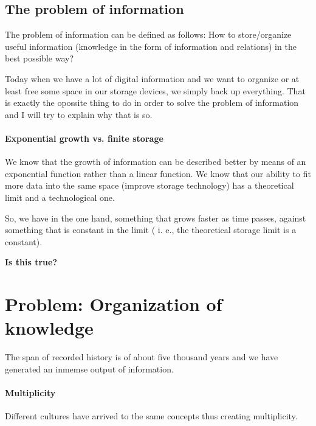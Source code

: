 \subsection{The problem of information}

\noindent
The problem of information can be defined as follows: 
How to store/organize useful information 
(knowledge in the form of information and relations) 
in the best possible way?
\par

\indent
Today when we have a lot of digital information
and we want to organize or at least free some space
in our storage devices, we simply back up everything.
That is exactly the opossite thing to do in order
to solve the problem of information and I will try 
to explain why that is so.
\par


\paragraph*{Exponential growth vs. finite storage}
\indent
We know that the growth of information
can be described better by means of an exponential 
function rather than a linear function. We know
that our ability to fit more data into the same space 
(improve storage technology) has a theoretical limit 
and a technological one.
\par

\indent
So, we have in the one hand, something that grows faster
as time passes, against something that is constant in the limit
( i. e., the theoretical storage limit is a constant).
\begin{Large}\textbf{Is this true?}\end{Large}
\par


\section{Problem: Organization of knowledge}

\indent
The span of recorded history is of about five thousand years
 \cite{wiki:ancient-hist} and we have generated an inmemse 
 output of information.
 
 \paragraph{Multiplicity}
 Different cultures have arrived to the same concepts thus
 creating multiplicity.
 
